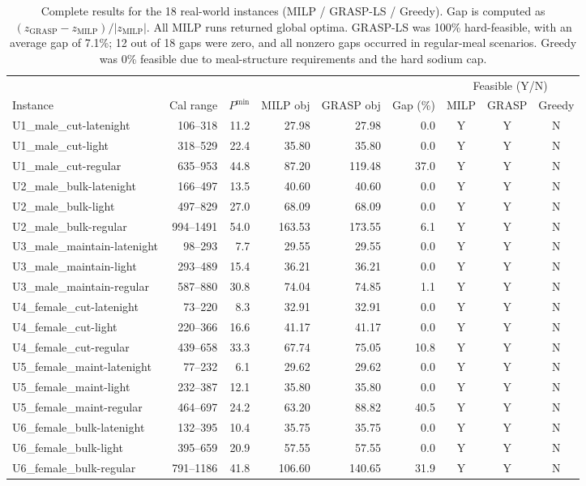 \documentclass[a4paper]{article}
\begin{document}
\begin{table}[h]
\centering\normalsize
\caption{Complete results for the 18 real-world instances (MILP / GRASP-LS / Greedy). Gap is computed as $(z_{\text{GRASP}}-z_{\text{MILP}})/|z_{\text{MILP}}|$. All MILP runs returned global optima. GRASP-LS was 100\% hard-feasible, with an average gap of 7.1\%; 12 out of 18 gaps were zero, and all nonzero gaps occurred in regular-meal scenarios. Greedy was 0\% feasible due to meal-structure requirements and the hard sodium cap.}
\label{tab:real}
\begin{tabular}{lrrrrrccc}
\toprule
 & & & & & & \multicolumn{3}{c}{Feasible (Y/N)} \\
\cmidrule(lr){7-9}
Instance & Cal range & $P^{\min}$ & MILP obj & GRASP obj & Gap (\%) & MILP & GRASP & Greedy \\
\midrule
U1\_male\_cut-latenight & 106--318 & 11.2 & 27.98 & 27.98 & 0.0 & Y & Y & N \\
U1\_male\_cut-light & 318--529 & 22.4 & 35.80 & 35.80 & 0.0 & Y & Y & N \\
U1\_male\_cut-regular & 635--953 & 44.8 & 87.20 & 119.48 & 37.0 & Y & Y & N \\
U2\_male\_bulk-latenight & 166--497 & 13.5 & 40.60 & 40.60 & 0.0 & Y & Y & N \\
U2\_male\_bulk-light & 497--829 & 27.0 & 68.09 & 68.09 & 0.0 & Y & Y & N \\
U2\_male\_bulk-regular & 994--1491 & 54.0 & 163.53 & 173.55 & 6.1 & Y & Y & N \\
U3\_male\_maintain-latenight & 98--293 & 7.7 & 29.55 & 29.55 & 0.0 & Y & Y & N \\
U3\_male\_maintain-light & 293--489 & 15.4 & 36.21 & 36.21 & 0.0 & Y & Y & N \\
U3\_male\_maintain-regular & 587--880 & 30.8 & 74.04 & 74.85 & 1.1 & Y & Y & N \\
U4\_female\_cut-latenight & 73--220 & 8.3 & 32.91 & 32.91 & 0.0 & Y & Y & N \\
U4\_female\_cut-light & 220--366 & 16.6 & 41.17 & 41.17 & 0.0 & Y & Y & N \\
U4\_female\_cut-regular & 439--658 & 33.3 & 67.74 & 75.05 & 10.8 & Y & Y & N \\
U5\_female\_maint-latenight & 77--232 & 6.1 & 29.62 & 29.62 & 0.0 & Y & Y & N \\
U5\_female\_maint-light & 232--387 & 12.1 & 35.80 & 35.80 & 0.0 & Y & Y & N \\
U5\_female\_maint-regular & 464--697 & 24.2 & 63.20 & 88.82 & 40.5 & Y & Y & N \\
U6\_female\_bulk-latenight & 132--395 & 10.4 & 35.75 & 35.75 & 0.0 & Y & Y & N \\
U6\_female\_bulk-light & 395--659 & 20.9 & 57.55 & 57.55 & 0.0 & Y & Y & N \\
U6\_female\_bulk-regular & 791--1186 & 41.8 & 106.60 & 140.65 & 31.9 & Y & Y & N \\
\bottomrule
\end{tabular}
\end{table}
\end{document}
